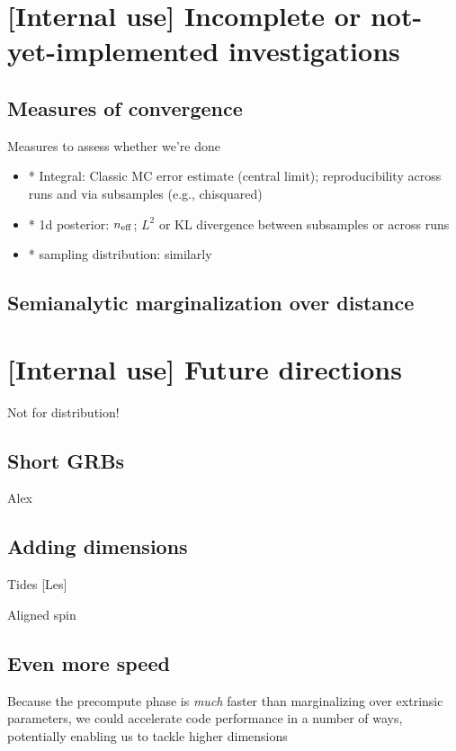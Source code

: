 \section{[Internal use] Incomplete or not-yet-implemented investigations}

\subsection{Measures of convergence}

Measures to assess whether we're done
\begin{itemize}
\item * Integral: Classic MC error estimate (central limit); reproducibility across runs and via subsamples (e.g., chisquared)

\item * 1d posterior:  $n_{\rm eff}$; $L^2$ or KL divergence between subsamples or across runs

\item * sampling distribution: similarly
\end{itemize}


\subsection{Semianalytic marginalization over distance}


\section{[Internal use] Future directions}

Not for distribution!

\subsection{Short GRBs}

Alex

\subsection{Adding dimensions}

Tides [Les]

Aligned spin

\subsection{Even more speed}

Because the precompute phase is \emph{much} faster than marginalizing over extrinsic parameters, we could accelerate
code performance in a number of ways, potentially enabling us to tackle higher dimensions

